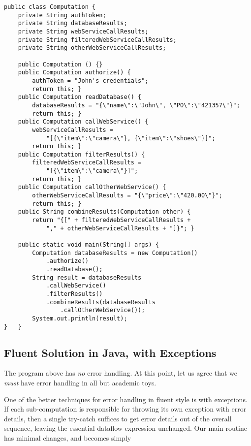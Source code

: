 \documentclass[11pt]{article}
\begin{document}
\begin{verbatim}
public class Computation {
    private String authToken;
    private String databaseResults;
    private String webServiceCallResults;
    private String filteredWebServiceCallResults;
    private String otherWebServiceCallResults;

    public Computation () {}
    public Computation authorize() {
        authToken = "John's credentials";
        return this; }
    public Computation readDatabase() {
        databaseResults = "{\"name\":\"John\", \"PO\":\"421357\"}";
        return this; }
    public Computation callWebService() {
        webServiceCallResults =
            "[{\"item\":\"camera\"}, {\"item\":\"shoes\"}]";
        return this; }
    public Computation filterResults() {
        filteredWebServiceCallResults =
            "[{\"item\":\"camera\"}]";
        return this; }
    public Computation callOtherWebService() {
        otherWebServiceCallResults = "{\"price\":\"420.00\"}";
        return this; }
    public String combineResults(Computation other) {
        return "{[" + filteredWebServiceCallResults +
            "," + otherWebServiceCallResults + "]}"; }

    public static void main(String[] args) {
        Computation databaseResults = new Computation()
            .authorize()
            .readDatabase();
        String result = databaseResults
            .callWebService()
            .filterResults()
            .combineResults(databaseResults
                .callOtherWebService());
        System.out.println(result);
}   }
\end{verbatim}
\subsection{Fluent Solution in Java, with Exceptions}
\label{sec-2-2}

The program above has \emph{no} error handling. At this point, let us
agree that we \emph{must} have error handling in all but academic toys.

One of the better techniques for error handling in fluent style is
with exceptions. If each sub-computation is responsible for
throwing its own exception with error details, then a single
try-catch suffices to get error details out of the overall
sequence, leaving the essential dataflow expression unchanged. Our
main routine has minimal changes, and becomes simply
\end{document}
